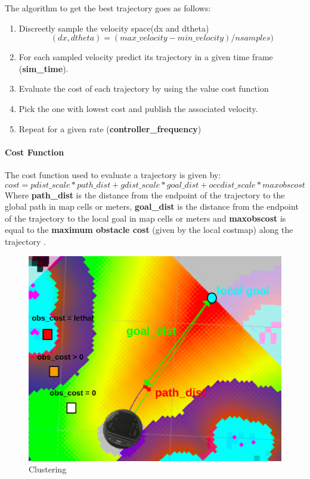 \documentclass[12pt]{article}
\begin{document}
The algorithm to get the best trajectory goes as follows:
\begin{enumerate}
    \item Discreetly sample the velocity space(dx and dtheta)
    \[(dx,dtheta)=(max\_velocity-min\_velocity)/nsamples)\]
    \item For each sampled velocity predict its trajectory in a given time frame (\textbf{sim\_time}).
    \item Evaluate the cost of each trajectory  by using the value cost function
    \item Pick the one with lowest cost and publish the associated velocity.
    \item Repeat for a given rate (\textbf{controller\_frequency})
\end{enumerate}


\paragraph{Cost Function}
The cost function used to evaluate a trajectory is given by:
\[
       cost = 
  pdist\_scale * path\_dist
  + gdist\_scale * goal\_dist
  + occdist\_scale * maxobscost 
\]
Where \textbf{path\_dist} is the distance from the endpoint of the trajectory to the global path in map cells or meters, \textbf{goal\_dist} is the distance from the endpoint of the trajectory to the local goal in map cells or meters and \textbf{maxobscost} is equal to the \textbf{maximum obstacle cost} (given by the local costmap) along the trajectory .
\begin{figure}[!htb]
    \centering
    \includegraphics[scale=0.3]{cost_cloud.png}
    \caption{Clustering}
    \label{fig:my_label}
\end{figure}
\end{document}
